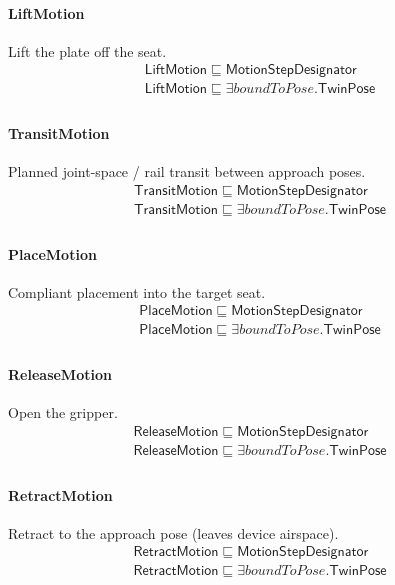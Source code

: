 \documentclass[10pt]{article}
\begin{document}
\paragraph{LiftMotion} Lift the plate off the seat.
\[\begin{array}{l}
\mathsf{LiftMotion} \sqsubseteq  \mathsf{MotionStepDesignator} \\
\mathsf{LiftMotion} \sqsubseteq  \exists \mathit{boundToPose}.\mathsf{TwinPose} \\
\end{array}\]
\paragraph{TransitMotion} Planned joint-space / rail transit between approach poses.
\[\begin{array}{l}
\mathsf{TransitMotion} \sqsubseteq  \mathsf{MotionStepDesignator} \\
\mathsf{TransitMotion} \sqsubseteq  \exists \mathit{boundToPose}.\mathsf{TwinPose} \\
\end{array}\]
\paragraph{PlaceMotion} Compliant placement into the target seat.
\[\begin{array}{l}
\mathsf{PlaceMotion} \sqsubseteq  \mathsf{MotionStepDesignator} \\
\mathsf{PlaceMotion} \sqsubseteq  \exists \mathit{boundToPose}.\mathsf{TwinPose} \\
\end{array}\]
\paragraph{ReleaseMotion} Open the gripper.
\[\begin{array}{l}
\mathsf{ReleaseMotion} \sqsubseteq  \mathsf{MotionStepDesignator} \\
\mathsf{ReleaseMotion} \sqsubseteq  \exists \mathit{boundToPose}.\mathsf{TwinPose} \\
\end{array}\]
\paragraph{RetractMotion} Retract to the approach pose (leaves device airspace).
\[\begin{array}{l}
\mathsf{RetractMotion} \sqsubseteq  \mathsf{MotionStepDesignator} \\
\mathsf{RetractMotion} \sqsubseteq  \exists \mathit{boundToPose}.\mathsf{TwinPose} \\
\end{array}\]
\end{document}
